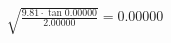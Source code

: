 \documentclass[preview]{standalone}
\begin{document}
\begin{align*}
\sqrt{\frac{9.81\cdot\tan{0.00000}}{2.00000}}=0.00000
\end{align*}
\end{document}
